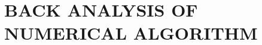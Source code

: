\documentclass[../Dissertation]{subfiles}
\begin{document}
    \chapter[\uppercase{Back Analysis of Numerical Algorithm}]{\uppercase{Back Analysis of Numerical Algorithm}}\label{chp:4}
    
    
    \vspace{-2ex}
    
    
    
    
    
    
    
    
    
    
    \printbibliography[segment=\therefsegment,heading=references]
    
\end{document}
